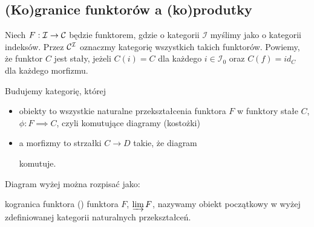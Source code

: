 \subsection{(Ko)granice funktorów a (ko)produtky}

Niech $F:\mathcal{I}\to \mathcal{C}$ będzie funktorem, gdzie o kategorii $\mathcal{I}$ myślimy jako o kategorii indeksów. Przez $\mathcal{C}^{\mathcal{I}}$ oznaczmy kategorię wszystkich takich funktorów. 
Powiemy, że funktor $C$ jest stały, jeżeli $C(i)=C$ dla każdego $i\in\mathcal{I}_0$ oraz $C(f)=id_C$ dla każdego morfizmu.

Budujemy kategorię, której 
\begin{itemize}
  \item obiekty to wszystkie naturalne przekształcenia funktora $F$ w funktory stałe $C$, $\phi:F\implies C$, czyli komutujące diagramy (kostożki) 
    \begin{center}
    \end{center}
  \item a morfizmy to strzałki $C\to D$ takie, że diagram
    \begin{center}
    \end{center}
    komutuje.
\end{itemize}

Diagram wyżej można rozpisać jako:
\begin{center}
\end{center}

\begin{definition}{kogranica funktora}{}
   () funktora $F$, $\varinjlim F$, nazywamy obiekt początkowy w wyżej zdefiniowanej kategorii naturalnych przekształceń. 
\end{definition}

